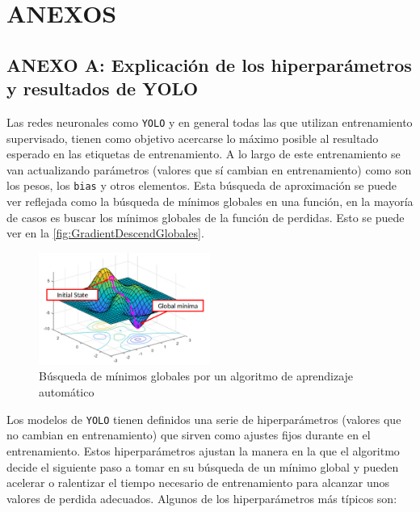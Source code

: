 \section{ANEXOS}
\subsection*{ANEXO A: Explicación de los hiperparámetros y resultados de YOLO}
\label{subsec:A}

Las redes neuronales como \texttt{YOLO} y en general todas las que utilizan entrenamiento supervisado, tienen como objetivo acercarse lo máximo posible al resultado esperado en las etiquetas de entrenamiento. 
A lo largo de este entrenamiento se van actualizando parámetros (valores que sí cambian en entrenamiento) como son los pesos, los \texttt{bias} y otros elementos. Esta búsqueda de aproximación se puede ver 
reflejada como la búsqueda de mínimos globales en una función, en la mayoría de casos es buscar los mínimos globales de la función de perdidas. Esto se puede ver en la \autoref{fig:GradientDescendGlobales}.

\begin{figure}[H]
    \centering
    \includegraphics[width=0.5\textwidth]{images/13/a/GradientDescend.png}
    \caption{Búsqueda de mínimos globales por un algoritmo de aprendizaje automático\cite{doleronDeepLearningScratch2023}}
    \label{fig:GradientDescendGlobales}
\end{figure}

Los modelos de \texttt{YOLO} tienen definidos una serie de hiperparámetros (valores que no cambian en entrenamiento) que sirven como ajustes fijos durante en el entrenamiento. 
Estos hiperparámetros ajustan la manera en la que el algoritmo decide el siguiente paso a tomar en su búsqueda de un mínimo global y pueden acelerar o ralentizar el tiempo necesario 
de entrenamiento para alcanzar unos valores de perdida adecuados. Algunos de los hiperparámetros más típicos\cite{ultralyticsConfiguration} son:

